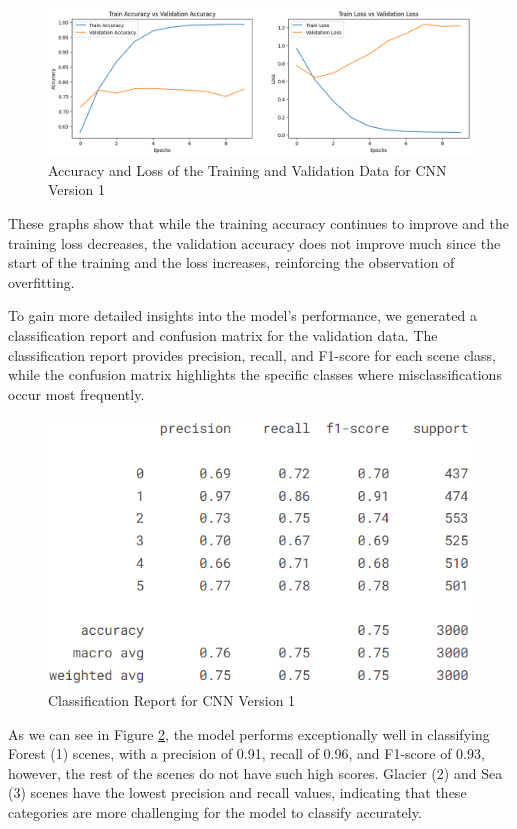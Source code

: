 \documentclass[conference]{IEEEtran}
\begin{document}
\begin{figure}[H]
    \centering
    \includegraphics[width=1\linewidth]{images/acc_loss_cnn_1.png}
    \caption{Accuracy and Loss of the Training and Validation Data for CNN Version 1}
    \label{fig:accuracyLossCNN1}
\end{figure}

These graphs show that while the training accuracy continues to improve and the training loss decreases, the validation accuracy does not improve much since the start of the training and the loss increases, reinforcing the observation of overfitting.

To gain more detailed insights into the model's performance, we generated a classification report and confusion matrix for the validation data. The classification report provides precision, recall, and F1-score for each scene class, while the confusion matrix highlights the specific classes where misclassifications occur most frequently.

\begin{figure}[H]
    \centering
    \includegraphics[width=0.8\linewidth]{images/cnn_class_report_1.png}
    \caption{Classification Report for CNN Version 1}
    \label{fig:classReportCNN1}
\end{figure}

As we can see in Figure \ref{fig:classReportCNN1}, the model performs exceptionally well in classifying Forest (1) scenes, with a precision of 0.91, recall of 0.96, and F1-score of 0.93, however, the rest of the scenes do not have such high scores. Glacier (2) and Sea (3) scenes have the lowest precision and recall values, indicating that these categories are more challenging for the model to classify accurately.
\end{document}
